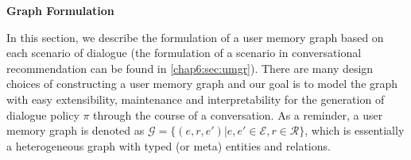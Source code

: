 \textbf{Graph Formulation}
\label{chap5:sec:graph}

In this section, we describe the formulation of a user memory graph based on each scenario of dialogue (the formulation of a scenario in conversational recommendation can be found in \ref{chap6:sec:umgr}).
There are many design choices of constructing a user memory graph and our goal is to model the graph with easy extensibility, maintenance and interpretability for the generation of dialogue policy $\pi$ through the course of a conversation.
As a reminder, a user memory graph is denoted as $\mathcal{G} = \{(e, r, e')\vert e, e' \in \mathcal{E}, r \in \mathcal{R} \}$, which is essentially a heterogeneous graph with typed (or meta) entities and relations. 

\begin{table}[H]
    \centering
    \vspace{-2pt}
    \caption{Ontology of Memory Graph} 
    \vspace{-10pt}
\label{chap5:tbl:meta_entity_edges}
\end{table}

